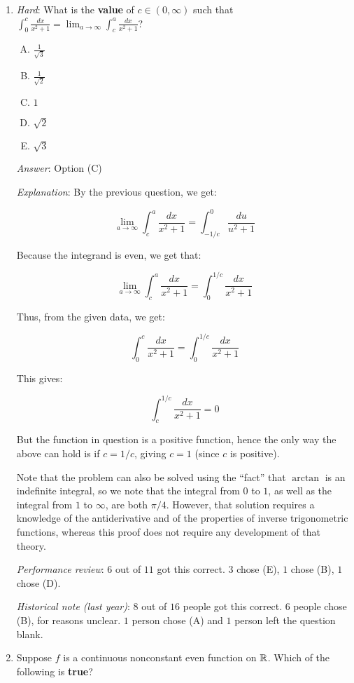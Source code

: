 \documentclass[10pt]{amsart}
\begin{document}
\begin{enumerate}
  {\em Action point}: Those who chose (D) either made a calculation
  error or forgot the relative derivative $1/u^2$ in the
  numerator. Please make sure you review $u$-substitutions and get
  this kind of question correct in the future.
\item {\em Hard}: What is the {\bf value} of $c \in (0,\infty)$ such
  that $\int_0^c \frac{dx}{x^2 + 1} = \lim_{a \to \infty} \int_c^a
  \frac{dx}{x^2 + 1}$?

  \begin{enumerate}[(A)]
  \item $\frac{1}{\sqrt{3}}$
  \item $\frac{1}{\sqrt{2}}$
  \item $1$
  \item $\sqrt{2}$
  \item $\sqrt{3}$
  \end{enumerate}

  {\em Answer}: Option (C)

  {\em Explanation}: By the previous question, we get:

  $$\lim_{a \to \infty} \int_c^a \frac{dx}{x^2 + 1} = \int_{-1/c}^0 \frac{du}{u^2 + 1}$$

  Because the integrand is even, we get that:

  $$\lim_{a \to \infty} \int_c^a \frac{dx}{x^2 + 1} = \int_0^{1/c} \frac{dx}{x^2 + 1}$$

  Thus, from the given data, we get:

  $$\int_0^c \frac{dx}{x^2 + 1} = \int_0^{1/c} \frac{dx}{x^2 + 1}$$

  This gives:

  $$\int_c^{1/c} \frac{dx}{x^2 + 1} = 0$$

  But the function in question is a positive function, hence the only
  way the above can hold is if $c = 1/c$, giving $c = 1$ (since $c$ is
  positive).

  Note that the problem can also be solved using the ``fact'' that
  $\arctan$ is an indefinite integral, so we note that the integral
  from $0$ to $1$, as well as the integral from $1$ to $\infty$, are
  both $\pi/4$. However, that solution requires a knowledge of the
  antiderivative and of the properties of inverse trigonometric
  functions, whereas this proof does not require any development of
  that theory.

  {\em Performance review}: $6$ out of $11$ got this correct. $3$
  chose (E), $1$ chose (B), $1$ chose (D).

  {\em Historical note (last year)}: $8$ out of $16$ people got this
  correct. $6$ people chose (B), for reasons unclear. $1$ person chose
  (A) and $1$ person left the question blank.
\item Suppose $f$ is a continuous nonconstant even function on
  $\mathbb{R}$. Which of the following is {\bf true}?
  

\end{enumerate}
\end{document}
